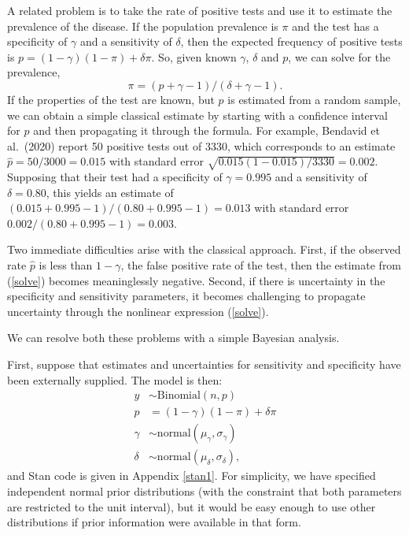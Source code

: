 \documentclass[11pt]{article}
\begin{document}
A related problem is to take the rate of positive tests and use it to estimate the prevalence of the disease.  If the population prevalence is $\pi$ and the test has a specificity of $\gamma$ and a sensitivity of $\delta$, then the expected frequency of positive tests is $p=(1-\gamma)(1- \pi)+ \delta\pi$.  So, given known $\gamma$, $\delta$ and $p$, we can solve for the prevalence,
\begin{equation}\label{solve}
  \pi=(p + \gamma - 1)/(\delta + \gamma - 1).
  \end{equation}
  If the properties of the test are known, but $p$ is estimated from a random sample, we can obtain a simple classical estimate by starting with a confidence interval for $p$ and then propagating it through the formula.  For example, Bendavid et al.\ (2020) report 50 positive tests out of 3330, which corresponds to an estimate  $\hat{p}=50/3000=0.015$ with standard error $\sqrt{0.015(1-0.015)/3330}=0.002$.  Supposing that their test had a specificity of $\gamma=0.995$ and a sensitivity of $\delta=0.80$, this yields an estimate of $(0.015 + 0.995 - 1)/(0.80 + 0.995 -1) = 0.013$ with standard error $0.002/(0.80 + 0.995 -1) = 0.003$.

 Two immediate difficulties arise with the classical approach.  First, if the observed rate $\hat{p}$ is less than  $1-\gamma$, the false positive rate of the test, then the estimate from (\ref{solve}) becomes meaninglessly negative.  Second, if there is uncertainty in the specificity and sensitivity parameters, it becomes challenging to propagate uncertainty through the nonlinear expression (\ref{solve}).

We can resolve both these problems with a simple Bayesian analysis.

First, suppose that estimates and uncertainties for sensitivity and specificity have been externally supplied.  The model is then:
\begin{align}
\nonumber  y & \sim \mbox{Binomial} (n, p)\\
\nonumber   p & = (1-\gamma)(1- \pi)+ \delta\pi\\
\nonumber  \gamma & \sim \mbox{normal}(\mu_{\gamma}, \sigma_{\gamma})\\
\label{normals}  \delta & \sim \mbox{normal}(\mu_{\delta}, \sigma_{\delta}),
\end{align}
and Stan code is given in Appendix \ref{stan1}.
For simplicity, we have specified independent normal prior distributions (with the constraint that both parameters are restricted to the unit interval), but it would be easy enough to use other distributions if prior information were available in that form.
\end{document}
